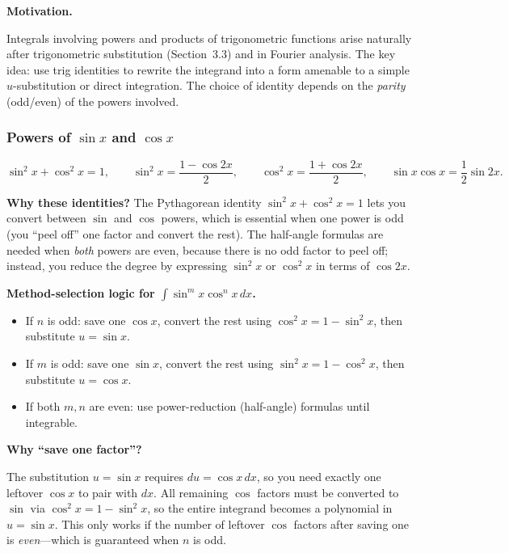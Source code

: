 \textbf{Motivation.}

Integrals involving powers and products of trigonometric functions arise naturally after trigonometric substitution (Section~3.3) and in Fourier analysis. The key idea: use trig identities to rewrite the integrand into a form amenable to a simple $u$-substitution or direct integration. The choice of identity depends on the \emph{parity} (odd/even) of the powers involved.

\subsubsection*{Powers of $\sin x$ and $\cos x$}

\begin{keyformula}[title={Key Formula: Power-reduction and Pythagorean identities}]

\[
\sin^2x+\cos^2x=1,\qquad
\sin^2x=\frac{1-\cos 2x}{2},\qquad
\cos^2x=\frac{1+\cos 2x}{2},\qquad
\sin x\cos x=\frac12\sin 2x.
\]

\end{keyformula}

\textbf{Why these identities?}
The Pythagorean identity $\sin^2x+\cos^2x=1$ lets you convert between $\sin$ and $\cos$ powers, which is essential when one power is odd (you ``peel off'' one factor and convert the rest). The half-angle formulas are needed when \emph{both} powers are even, because there is no odd factor to peel off; instead, you reduce the degree by expressing $\sin^2x$ or $\cos^2x$ in terms of $\cos 2x$.

\noindent
\textbf{Method-selection logic for $\int \sin^m x\cos^n x\,dx$.}

\begin{itemize}
\item If $n$ is odd: save one $\cos x$, convert the rest using $\cos^2x=1-\sin^2x$, then substitute $u=\sin x$.
\item If $m$ is odd: save one $\sin x$, convert the rest using $\sin^2x=1-\cos^2x$, then substitute $u=\cos x$.
\item If both $m,n$ are even: use power-reduction (half-angle) formulas until integrable.
\end{itemize}

\textbf{Why ``save one factor''?}

The substitution $u=\sin x$ requires $du=\cos x\,dx$, so you need exactly one leftover $\cos x$ to pair with $dx$. All remaining $\cos$ factors must be converted to $\sin$ via $\cos^2x=1-\sin^2x$, so the entire integrand becomes a polynomial in $u=\sin x$. This only works if the number of leftover $\cos$ factors after saving one is \emph{even}---which is guaranteed when $n$ is odd.

